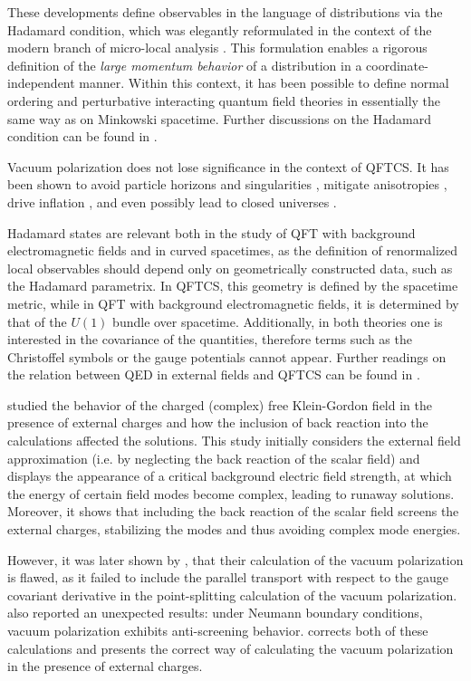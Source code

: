 These developments define observables in the language of distributions via the Hadamard condition, which was elegantly reformulated in the context of the modern branch of micro-local analysis \cite{Radzikowski1996}. This formulation enables  a rigorous definition of the \textit{large momentum behavior} of a distribution in a coordinate-independent manner. Within this context, it has been possible to define normal ordering and perturbative interacting quantum field theories in essentially the same way as on Minkowski spacetime. Further discussions on the Hadamard condition can be found in \cite{Wald1977, KAY199149, Fewster_2013}.

 Vacuum polarization does not lose significance in the context of QFTCS. It has been shown to avoid particle horizons and singularities \cite{Fulling1973, Fischetti1979}, mitigate anisotropies \cite{STAROBINSKY198099, Hartle1979}, drive inflation \cite{Guth1981},  and even possibly lead to closed universes \cite{Anderson:1985vi}.

Hadamard states are relevant both in the study of QFT with background electromagnetic fields and in curved spacetimes, as the definition of renormalized local observables should depend only on geometrically constructed data, such as the Hadamard parametrix. In QFTCS, this geometry is defined by the spacetime metric,  while in QFT with background electromagnetic fields, it is determined by that of the $U(1)$  bundle over spacetime.
Additionally, in both theories one is interested in the covariance of the quantities, therefore terms such as the Christoffel symbols or the gauge potentials cannot appear.
Further readings on the relation between QED in external fields and QFTCS can be found in \cite{marecki2004quantumelectrodynamicsbackgroundexternal}.

\cite{Ambj1983} studied the behavior of the charged (complex) free Klein-Gordon field  in the presence of external charges and how the inclusion of back reaction into the calculations affected the solutions. This study initially considers the external field approximation (i.e. by neglecting the back reaction of the scalar field) and displays the appearance of a critical background electric field strength, at which the energy of certain field modes become complex, leading to runaway solutions.
Moreover, it shows that including the back reaction of the scalar field screens the external charges, stabilizing the modes and thus avoiding complex mode energies.

However, it was later shown by \cite{Schl2015, Wernersson2020}, that their calculation of the vacuum polarization is flawed,
as it failed to include the parallel transport with respect to the gauge covariant derivative in the point-splitting calculation of the vacuum polarization. \cite{Ambj1983} also reported an unexpected results: under Neumann boundary conditions, vacuum polarization exhibits anti-screening behavior. \cite{Wernersson2020} corrects both of these calculations and presents the correct way of calculating the vacuum polarization in the presence of external charges. 

